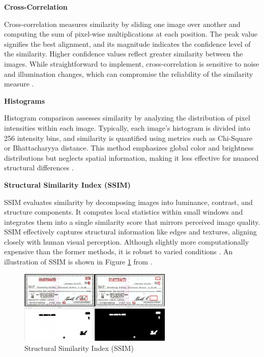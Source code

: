 \textbf{Cross-Correlation}

Cross-correlation measures similarity by sliding one image over another and computing the sum of pixel-wise multiplications at each position. The peak value signifies the best alignment, and its magnitude indicates the confidence level of the similarity. Higher confidence values reflect greater similarity between the images. While straightforward to implement, cross-correlation is sensitive to noise and illumination changes, which can compromise the reliability of the similarity measure \cite{sharma2022crosscorrelation}.

\textbf{Histograms}

Histogram comparison assesses similarity by analyzing the distribution of pixel intensities within each image. Typically, each image's histogram is divided into 256 intensity bins, and similarity is quantified using metrics such as Chi-Square or Bhattacharyya distance. This method emphasizes global color and brightness distributions but neglects spatial information, making it less effective for nuanced structural differences \cite{rosebrock2014comparehistograms}.

\textbf{Structural Similarity Index (SSIM)}

SSIM evaluates similarity by decomposing images into luminance, contrast, and structure components. It computes local statistics within small windows and integrates them into a single similarity score that mirrors perceived image quality. SSIM effectively captures structural information like edges and textures, aligning closely with human visual perception. Although slightly more computationally expensive than the former methods, it is robust to varied conditions \cite{rosebrock2017imagedifference}. An illustration of SSIM is shown in Figure \ref{fig:ssim} from \cite{rosebrock2017imagedifference}.

\begin{figure}[H]
    \centering
    \includegraphics[width=0.65\textwidth]{./Chapter 2/litfigs/SSIMeg.png}
    \caption{Structural Similarity Index (SSIM)}
    \label{fig:ssim}
\end{figure}

